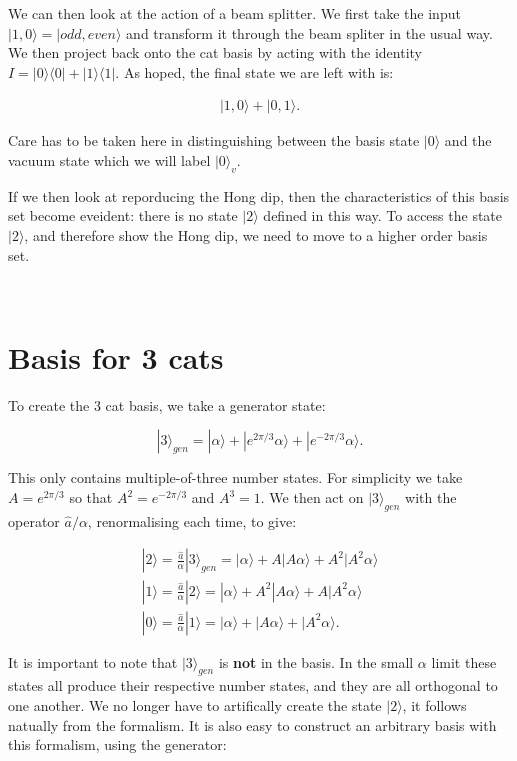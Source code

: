 \documentclass[twocolumn,prl]{revtex4}
\begin{document}
We can then look at the action of a beam splitter. We first take the input $|1,0\rangle=|{odd},{even}\rangle$ and transform it through the beam spliter in the usual way. We then project back onto the cat basis by acting with the identity $I=|0\rangle\langle0|+|1\rangle\langle1|$. As hoped, the final state we are left with is:

\begin{eqnarray}
|1,0\rangle+|0,1\rangle.
\end{eqnarray}

Care has to be taken here in distinguishing between the basis state $|0\rangle$ and the vacuum state which we will label $|0\rangle_v$.

If we then look at reporducing the Hong dip, then the characteristics of this basis set become eveident: there is no state $|2\rangle$ defined in this way. To access the state $|2\rangle$, and therefore show the Hong dip, we need to move to a higher order basis set.

\

\section{Basis for 3 cats}

To create the 3 cat basis, we take a generator state:

\begin{equation}
|3\rangle_{gen}=|\alpha\rangle +|e^{2\pi/3}\alpha\rangle +|e^{-2\pi/3}\alpha\rangle.
\end{equation}

This only contains multiple-of-three number states. For simplicity we take $A=e^{2\pi/3}$ so that $A^2=e^{-2\pi/3}$ and $A^3=1$. We then act on $|3\rangle_{gen}$ with the operator $\hat{a}/\alpha$, renormalising each time, to give:

\begin{eqnarray}
|2\rangle=\frac{\hat{a}}{\alpha}|3\rangle_{gen}=|\alpha\rangle +A|A\alpha\rangle +A^2|A^2\alpha\rangle \\
|1\rangle=\frac{\hat{a}}{\alpha}|2\rangle=|\alpha\rangle +A^2|A\alpha\rangle +A|A^2\alpha\rangle \\
|0\rangle=\frac{\hat{a}}{\alpha}|1\rangle=|\alpha\rangle +|A\alpha\rangle +|A^2\alpha\rangle.
\end{eqnarray}

It is important to note that $|3\rangle_{gen}$ is \textbf{not} in the basis. In the small $\alpha$ limit these states all produce their respective number states, and they are all orthogonal to one another. We no longer have to artifically create the state $|2\rangle$, it follows natually from the formalism. It is also easy to construct an arbitrary basis with this formalism, using the generator:
\end{document}
